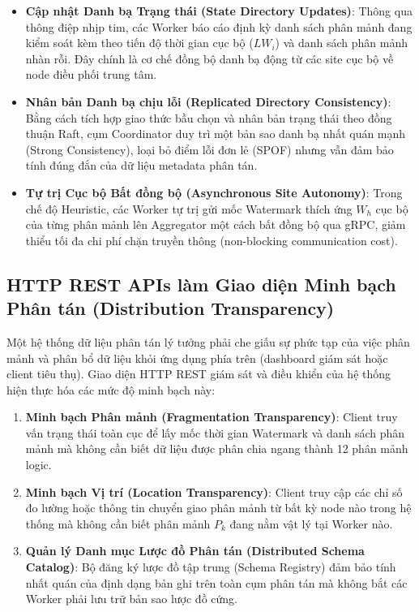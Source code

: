\documentclass[12pt,a4paper]{article}
\begin{document}
\begin{itemize}[leftmargin=*]
    \item \textbf{Cập nhật Danh bạ Trạng thái (State Directory Updates)}: Thông qua thông điệp nhịp tim, các Worker báo cáo định kỳ danh sách phân mảnh đang kiểm soát kèm theo tiến độ thời gian cục bộ ($LW_i$) và danh sách phân mảnh nhàn rỗi. Đây chính là cơ chế đồng bộ danh bạ động từ các site cục bộ về node điều phối trung tâm.
    \item \textbf{Nhân bản Danh bạ chịu lỗi (Replicated Directory Consistency)}: Bằng cách tích hợp giao thức bầu chọn và nhân bản trạng thái theo đồng thuận Raft, cụm Coordinator duy trì một bản sao danh bạ nhất quán mạnh (Strong Consistency), loại bỏ điểm lỗi đơn lẻ (SPOF) nhưng vẫn đảm bảo tính đúng đắn của dữ liệu metadata phân tán.
    \item \textbf{Tự trị Cục bộ Bất đồng bộ (Asynchronous Site Autonomy)}: Trong chế độ Heuristic, các Worker tự trị gửi mốc Watermark thích ứng $W_h$ cục bộ của từng phân mảnh lên Aggregator một cách bất đồng bộ qua gRPC, giảm thiểu tối đa chi phí chặn truyền thông (non-blocking communication cost).
\end{itemize}

\subsection{HTTP REST APIs làm Giao diện Minh bạch Phân tán (Distribution Transparency)}
Một hệ thống dữ liệu phân tán lý tưởng phải che giấu sự phức tạp của việc phân mảnh và phân bổ dữ liệu khỏi ứng dụng phía trên (dashboard giám sát hoặc client tiêu thụ). Giao diện HTTP REST giám sát và điều khiển của hệ thống hiện thực hóa các mức độ minh bạch này:

\begin{enumerate}
    \item \textbf{Minh bạch Phân mảnh (Fragmentation Transparency)}: Client truy vấn trạng thái toàn cục để lấy mốc thời gian Watermark và danh sách phân mảnh mà không cần biết dữ liệu được phân chia ngang thành 12 phân mảnh logic.
    \item \textbf{Minh bạch Vị trí (Location Transparency)}: Client truy cập các chỉ số đo lường hoặc thông tin chuyển giao phân mảnh từ bất kỳ node nào trong hệ thống mà không cần biết phân mảnh $P_k$ đang nằm vật lý tại Worker nào.
    \item \textbf{Quản lý Danh mục Lược đồ Phân tán (Distributed Schema Catalog)}: Bộ đăng ký lược đồ tập trung (Schema Registry) đảm bảo tính nhất quán của định dạng bản ghi trên toàn cụm phân tán mà không bắt các Worker phải lưu trữ bản sao lược đồ cứng.
\end{enumerate}
\end{document}
